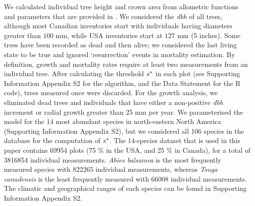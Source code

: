 We calculated individual tree height and crown area from allometric functions and parameters that are provided in \citet{Purves2007}. We considered the \textit{dbh} of all trees, although most Canadian inventories start with individuals having diameters greater than $ 100 $ mm, while USA inventories start at $ 127 $ mm (5 inches). Some trees have been recorded as dead and then alive; we considered the last living state to be true and ignored `resurrection' events in mortality estimation. By definition, growth and mortality rates require at least two measurements from an individual tree. After calculating the threshold $ {s}^{*} $ in each plot (see Supporting Information Appendix S2 for the algorithm, and the Data Statement for the R code), trees measured once were discarded. For the growth analysis, we eliminated dead trees and individuals that have either a non-positive \textit{dbh} increment or radial growth greater than 25 mm per year. We parameterised the model for the 14 most abundant species in north-eastern North America (Supporting Information Appendix S2), but we considered all 106 species in the database for the computation of $ {s}^{*} $. The 14-species dataset that is used in this paper contains \num{69954} plots (75 \% in the USA, and 25 \% in Canada), for a total of \num{3816854} individual measurements. \textit{Abies balsamea} is the most frequently measured species with \num{822265} individual measurements, whereas \textit{Tsuga canadensis} is the least frequently measured with \num{66008} individual measurements. The climatic and geographical ranges of each species can be found in Supporting Information Appendix S2.

